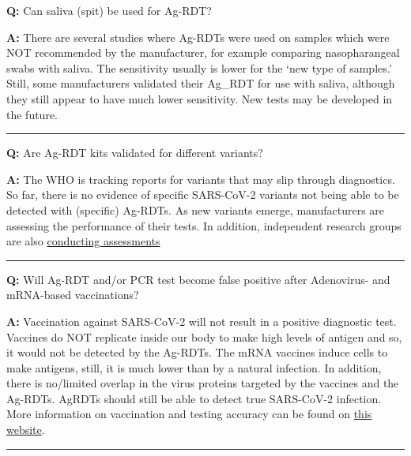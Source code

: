 \documentclass[
]{book}
\begin{document}
\textbf{Q:} Can saliva (spit) be used for Ag-RDT?

\textbf{A:} There are several studies where Ag-RDTs were used on samples which were NOT recommended by the manufacturer, for example comparing nasopharangeal swabs with saliva. The sensitivity usually is lower for the `new type of samples.' Still, some manufacturers validated their Ag\_RDT for use with saliva, although they still appear to have much lower sensitivity. New tests may be developed in the future.

\begin{center}\rule{0.5\linewidth}{0.5pt}\end{center}

\textbf{Q:} Are Ag-RDT kits validated for different variants?

\textbf{A:} The WHO is tracking reports for variants that may slip through diagnostics. So far, there is no evidence of specific SARS-CoV-2 variants not being able to be detected with (specific) Ag-RDTs. As new variants emerge, manufacturers are assessing the performance of their tests. In addition, independent research groups are also \href{https://www.eurosurveillance.org/content/10.2807/1560-7917.ES.2021.26.16.2100413}{conducting assessments}

\begin{center}\rule{0.5\linewidth}{0.5pt}\end{center}

\textbf{Q:} Will Ag-RDT and/or PCR test become false positive after Adenovirus- and mRNA-based vaccinations?

\textbf{A:} Vaccination against SARS-CoV-2 will not result in a positive diagnostic test. Vaccines do NOT replicate inside our body to make high levels of antigen and so, it would not be detected by the Ag-RDTs. The mRNA vaccines induce cells to make antigens, still, it is much lower than by a natural infection. In addition, there is no/limited overlap in the virus proteins targeted by the vaccines and the Ag-RDTs. AgRDTs should still be able to detect true SARS-CoV-2 infection. More information on vaccination and testing accuracy can be found on \href{https://www.jhsph.edu/covid-19/articles/variants-vaccines-and-what-they-mean-for-covid19-testing.html}{this website}.

\begin{center}\rule{0.5\linewidth}{0.5pt}\end{center}
\end{document}
